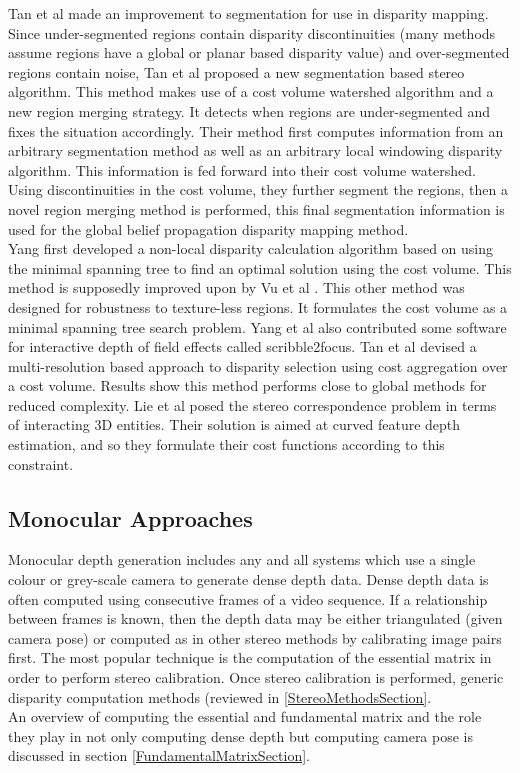 Tan et al \cite{Tan14Stereo} made an improvement to segmentation for use in disparity mapping. Since under-segmented regions contain disparity discontinuities (many methods assume regions have a global or planar based disparity value) and over-segmented regions contain noise, Tan et al proposed a new segmentation based stereo algorithm. This method makes use of a cost volume watershed algorithm and a new region merging strategy. It detects when regions are under-segmented and fixes the situation accordingly. Their method first computes information from an arbitrary segmentation method as well as an arbitrary local windowing disparity algorithm. This information is fed forward into their cost volume watershed. Using discontinuities in the cost volume, they further segment the regions, then a novel region merging method is performed, this final segmentation information is used for the global belief propagation disparity mapping method. \\


Yang \cite{Yang14Pattern} first developed a non-local disparity calculation algorithm based on using the minimal spanning tree to find an optimal solution using the cost volume. This method is supposedly improved upon by Vu et al \cite{Vu14Efficient}. This other method was designed for robustness to texture-less regions. It formulates the cost volume as a minimal spanning tree search problem. Yang et al also contributed some software for interactive depth of field effects called scribble2focus. Tan et al \cite{Tan14Soft} devised a multi-resolution based approach to disparity selection using cost aggregation over a cost volume. Results show this method performs close to global methods for reduced complexity. Lie et al \cite{Liu143d} posed the stereo correspondence problem in terms of interacting 3D entities. Their solution is aimed at curved feature depth estimation, and so they formulate their cost functions according to this constraint. \\



\subsection{Monocular Approaches}

Monocular depth generation includes any and all systems which use a single colour or grey-scale camera to generate dense depth data. Dense depth data is often computed using consecutive frames of a video sequence. If a relationship between frames is known, then the depth data may be either triangulated (given camera pose) or computed as in other stereo methods by calibrating image pairs first. The most popular technique is the computation of the essential matrix in order to perform stereo calibration. Once stereo calibration is performed, generic disparity computation methods (reviewed in \ref{StereoMethodsSection}. \\

An overview of computing the essential and fundamental matrix and the role they play in not only computing dense depth but computing camera pose is discussed in section \ref{FundamentalMatrixSection}. 

